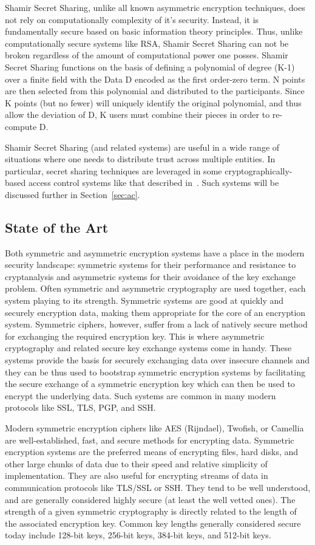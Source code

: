 \documentclass{sig-alternate}
\begin{document}
Shamir Secret Sharing, unlike all known asymmetric encryption
techniques, does not rely on computationally complexity of it's
security. Instead, it is fundamentally secure based on basic
information theory principles. Thus, unlike computationally secure
systems like RSA, Shamir Secret Sharing can not be broken regardless
of the amount of computational power one posses. Shamir Secret Sharing
functions on the basis of defining a polynomial of degree (K-1) over a
finite field with the Data D encoded as the first order-zero term. N
points are then selected from this polynomial and distributed to the
participants. Since K points (but no fewer) will uniquely identify the
original polynomial, and thus allow the deviation of D, K users must
combine their pieces in order to re-compute D.

Shamir Secret Sharing (and related systems) are useful in a wide range
of situations where one needs to distribute trust across multiple
entities. In particular, secret sharing techniques are leveraged in
some cryptographically-based access control systems like that
described in~\cite{Goyal2006}. Such systems will be discussed further
in Section~\ref{sec:ac}.

\subsection{State of the Art}

Both symmetric and asymmetric encryption systems have a place in the
modern security landscape: symmetric systems for their performance and
resistance to cryptanalysis and asymmetric systems for their
avoidance of the key exchange problem.  Often symmetric and asymmetric
cryptography are used together, each system playing to its
strength. Symmetric systems are good at quickly and securely
encryption data, making them appropriate for the core of an encryption
system. Symmetric ciphers, however, suffer from a lack of natively
secure method for exchanging the required encryption key. This is
where asymmetric cryptography and related secure key exchange systems
come in handy. These systems provide the basis for securely exchanging
data over insecure channels and they can be thus used to bootstrap
symmetric encryption systems by facilitating the secure exchange of a
symmetric encryption key which can then be used to encrypt the
underlying data. Such systems are common in many modern protocols like
SSL, TLS, PGP, and SSH.

Modern symmetric encryption ciphers like AES (Rijndael), Twofish, or
Camellia are well-established, fast, and secure methods for encrypting
data. Symmetric encryption systems are the preferred means of
encrypting files, hard disks, and other large chunks of data due to
their speed and relative simplicity of implementation. They are also
useful for encrypting streams of data in communication protocols like
TLS/SSL or SSH. They tend to be well understood, and are generally
considered highly secure (at least the well vetted ones). The strength
of a given symmetric cryptography is directly related to the length of
the associated encryption key. Common key lengths generally considered
secure today include 128-bit keys, 256-bit keys, 384-bit keys, and
512-bit keys.
\end{document}
